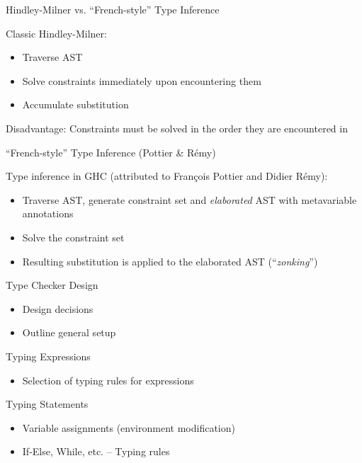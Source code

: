 \documentclass[dvipsnames,aspectratio=169]{beamer}
\begin{document}
\begin{frame}{Hindley-Milner vs. ``French-style'' Type Inference}

  Classic Hindley-Milner:
  \begin{itemize}
    \item Traverse AST
    \item Solve constraints immediately upon encountering them
    \item Accumulate substitution
  \end{itemize}

  Disadvantage: Constraints must be solved in the order they are encountered in

\end{frame}


\begin{frame}{``French-style'' Type Inference (Pottier \& Rémy)}

  Type inference in GHC (attributed to François Pottier and Didier Rémy):
  \begin{itemize}
    \item Traverse AST, generate constraint set and \emph{elaborated} AST with
          metavariable annotations
    \item Solve the constraint set
    \item Resulting substitution is applied to the elaborated AST (``\emph{zonking}'')
  \end{itemize}

\end{frame}


\begin{frame}{Type Checker Design}

  \begin{itemize}
    \item Design decisions
    \item Outline general setup
  \end{itemize}

\end{frame}


\begin{frame}{Typing Expressions}

  \begin{itemize}
    \item Selection of typing rules for expressions
  \end{itemize}

\end{frame}


\begin{frame}{Typing Statements}

  \begin{itemize}
    \item Variable assignments (environment modification)
    \item If-Else, While, etc. -- Typing rules
  \end{itemize}

\end{frame}
\end{document}
